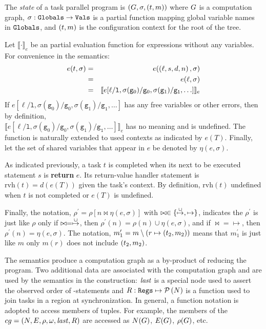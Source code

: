 The \emph{state} of a task parallel program is $\left( G, \sigma,
  \left( t,m \right) \right)$ where $G$ is a computation graph, $\sigma:
\mathtt{Globals} \rightarrow \mathtt{Vals}$ is a partial function mapping global
variable names in $\mathtt{Globals}$, and $\left( t,m \right)$ is the configuration context for the root of the tree. 

Let $\llbracket \cdot \rrbracket_e$ be an partial evaluation function
for expressions without any variables. For convenience in the
semantics:
\begin{eqnarray*}
  e(t, \sigma) &=& e(\left( \ell, s, d, n \right), \sigma) \\
  &=& e(\ell, \sigma) \\
  &=& \llbracket e[\ell / \texttt{l}, \sigma(\mathtt{g}_0) / \mathtt{g}_0, \sigma(\mathtt{g}_1) / \mathtt{g_1}, \ldots]  \rrbracket_e
  \end{eqnarray*}
If $e[\ell / \texttt{l}, \sigma(\mathtt{g}_0) / \mathtt{g}_0,
  \sigma(\mathtt{g}_1) / \mathtt{g_1}, \ldots]$ has any free variables
or other errors, then by definition, \\ $\llbracket e[\ell /
  \texttt{l}, \sigma(\mathtt{g}_0) / \mathtt{g}_0,
  \sigma(\mathtt{g}_1) / \mathtt{g_1}, \ldots] \rrbracket_e$ has no
meaning and is undefined. The function is naturally extended to used
contexts as indicated by $e(T)$.  Finally, let the set of shared
variables that appear in $e$ be denoted by $\eta(e,\sigma)$.

As indicated previously, a task $t$ is completed when its next to be
executed statement $s$ is \textbf{return} $e$. Its return-value
handler statement is $\mathrm{rvh}(t) = d(e(T))$ given the task's
context.  By definition, $\mathrm{rvh}(t)$ undefined when $t$ is not
completed or $e(T)$ is undefined.

Finally, the notation, $\rho^\prime = \rho[n \bowtie \eta(e,\sigma)]$
with $\bowtie \in \{\overset{\cup}{\mapsto},\mapsto\}$, indicates the $\rho^\prime$
is just like $\rho$ only if $\bowtie = \overset{\cup}{\mapsto}$, then $\rho^\prime(n)
= \rho(n) \cup \eta(e,\sigma)$, and if $\bowtie = \mapsto$, then
$\rho^\prime(n) = \eta(e,\sigma)$. The notation, $m_1^\prime = m
\setminus (r \mapsto \left( t_2,m_2 \right))$ means that $m_1^\prime$ is just
like $m$ only $m(r)$ does not include $\left( t_2,m_2 \right)$.

The semantics produce a computation graph as a by-product of reducing
the program. Two additional data are associated with the computation
graph and are used by the semantics in the construction: $\mathit{last}$ is a
special node used to assert the observed order of \isolated-statements
and $R : \mathtt{Regs} \mapsto \mathcal{P}\left(N\right)$ is a function used
to join tasks in a region at synchronization.  In general, a function
notation is adopted to access members of tuples. For example, the
members of the $cg = \left( N,E, \rho,\omega,\mathit{last},R \right)$ are accessed as $N(G)$, $E(G)$,
$\rho(G)$, etc.


